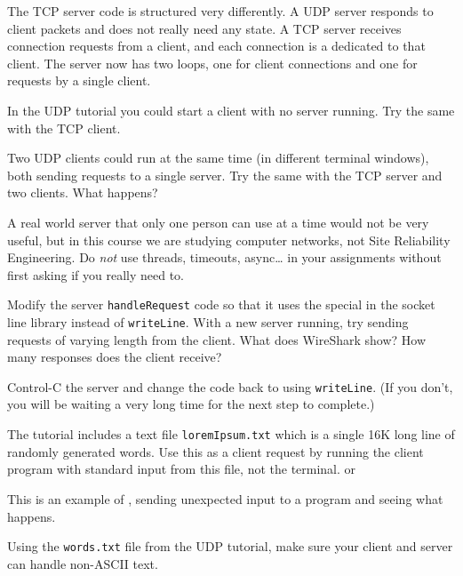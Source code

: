 The TCP server code is structured very differently. A UDP server responds
to client packets and does not really need any state. A TCP server receives
connection requests from a client, and each connection is a 
dedicated to that client. The server now has two loops, one for client connections
and one for requests by a single client.



In the UDP tutorial you could start a client with no server running. Try the
same with the TCP client.

Two UDP clients could run at the same time (in different terminal windows),
both sending requests to a single server. Try the same with the TCP server
and two clients. What happens?

\begin{IMPORTANT}
A real world server that only one person can use at a time would not be very
useful, but in this course we are studying computer networks, not Site
Reliability Engineering. Do \emph{not} use threads, timeouts, async\ldots
in your assignments without first asking if you really need to.
\end{IMPORTANT}

\STEP Modify the server \texttt{handleRequest} code so that it uses the special
 in the socket line library instead of \texttt{writeLine}.
With a new server running, try sending requests of varying length from the
client. What does WireShark show? How many responses does the client receive?

Control-C the server and change the code back to using \texttt{writeLine}.
(If you don't, you will be waiting a very long time for the next step to
complete.)

\STEP The tutorial includes a text file \texttt{loremIpsum.txt} which is a
single 16K long line of randomly generated words. Use this as a client
request by running the client program with standard input from this file,
not the terminal.
or

\begin{IMPORTANT}
This is an example of , sending unexpected input to a program
and seeing what happens.
\end{IMPORTANT}

\STEP Using the \texttt{words.txt} file from the UDP tutorial, make sure
your client and server can handle non-ASCII text.


